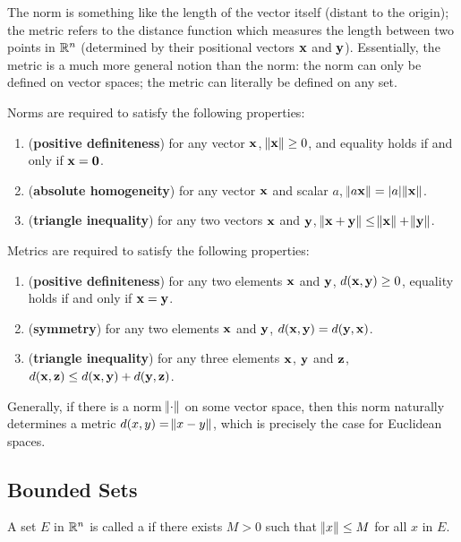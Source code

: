 \begin{remark}
The norm is something like the length of the vector itself (distant to the origin); the metric refers to the distance function which measures the length between two points in $\mathbb R^n$ (determined by their positional vectors $\vb{x}$ and $\vb{y}$). Essentially, the metric is a much more general notion than the norm: the norm can only be defined on vector spaces; the metric can literally be defined on any set.
\end{remark}

Norms are required to satisfy the following properties:
\begin{enumerate}[label=(\arabic*)]
\item (\textbf{positive definiteness}) for any vector $\vb{x}$, $\norm{\vb{x}}\ge0$, and equality holds if and only if $\vb{x}=\vb{0}$.
\item (\textbf{absolute homogeneity}) for any vector $\vb{x}$ and scalar $a$, $\norm{a\vb{x}}=|a|\norm{\vb{x}}$.
\item (\textbf{triangle inequality}) for any two vectors $\vb{x}$ and $\vb{y}$, $\norm{\vb{x}+\vb{y}}\le\norm{\vb{x}}+\norm{\vb{y}}$.
\end{enumerate}

Metrics are required to satisfy the following properties:
\begin{enumerate}[label=(\arabic*)]
\item (\textbf{positive definiteness}) for any two elements $\vb{x}$ and $\vb{y}$, $d(\vb{x},\vb{y})\ge0$, equality holds if and only if $\vb{x}=\vb{y}$.
\item (\textbf{symmetry}) for any two elements $\vb{x}$ and $\vb{y}$, $d(\vb{x},\vb{y})=d(\vb{y},\vb{x})$.
\item (\textbf{triangle inequality}) for any three elements $\vb{x}$, $\vb{y}$ and $\vb{z}$, $d(\vb{x},\vb{z})\le d(\vb{x},\vb{y})+d(\vb{y},\vb{z})$.
\end{enumerate}

Generally, if there is a norm $\norm{\cdot}$ on some vector space, then this norm naturally determines a metric $d(x,y)=\norm{x-y}$, which is precisely the case for Euclidean spaces.

\subsection{Bounded Sets}
\begin{definition}
A set $E$ in $\mathbb R^n$ is called a  if there exists $M>0$ such that $\norm{x}\le M$ for all $x$ in $E$.
\end{definition}

